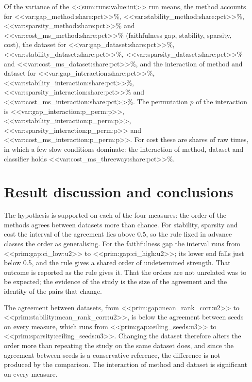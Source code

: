 \documentclass[10pt,a4paper,twocolumn]{article}
\begin{document}
Of the variance of the <<sum:runs:value:int>> run means, the method accounts for
<<var:gap_method:share:pct>>\%, <<var:stability_method:share:pct>>\%,
<<var:sparsity_method:share:pct>>\% and <<var:cost_ms_method:share:pct>>\% (faithfulness
gap, stability, sparsity, cost), the dataset for <<var:gap_dataset:share:pct>>\%,
<<var:stability_dataset:share:pct>>\%, <<var:sparsity_dataset:share:pct>>\% and
<<var:cost_ms_dataset:share:pct>>\%, and the interaction of method and dataset for
<<var:gap_interaction:share:pct>>\%, <<var:stability_interaction:share:pct>>\%,
<<var:sparsity_interaction:share:pct>>\% and <<var:cost_ms_interaction:share:pct>>\%. The
permutation $p$ of the interaction is <<var:gap_interaction:p_perm:p>>,
<<var:stability_interaction:p_perm:p>>, <<var:sparsity_interaction:p_perm:p>> and
<<var:cost_ms_interaction:p_perm:p>>. For cost these are shares of raw times, in which a
few slow conditions dominate: the interaction of method, dataset and classifier holds
<<var:cost_ms_threeway:share:pct>>\%.

\section{Result discussion and conclusions}

The hypothesis is supported on each of the four measures: the order of the methods agrees
between datasets more than chance. For stability, sparsity and cost the interval of the
agreement lies above 0.5, so the rule fixed in advance classes the order as generalising.
For the
faithfulness gap the interval runs from <<prim:gap:ci_low:u2>> to
<<prim:gap:ci_high:u2>>; its lower end falls just below 0.5, and the rule gives a shared
order of undetermined strength. That outcome is reported as the rule gives it. That the
orders are not unrelated was to be expected; the evidence of the study is the size of the
agreement and the identity of the pairs that change.

The agreement between datasets, from <<prim:gap:mean_rank_corr:u2>> to
<<prim:stability:mean_rank_corr:u2>>, is below the agreement between seeds on every
measure, which runs from <<prim:gap:ceiling_seeds:u3>> to
<<prim:sparsity:ceiling_seeds:u3>>. Changing the dataset therefore
alters the order more than repeating the study on the same dataset does, and since the
agreement between seeds is a conservative reference, the difference is not produced by
the comparison. The interaction of method and dataset is significant on every measure.
\end{document}
